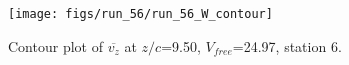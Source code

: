 \begin{figure}[H]
\centering
\texttt{[image: figs/run\_56/run\_56\_W\_contour]}
\caption{Contour plot of $\overline{v_{z}}$ at $z/c$=9.50, $V_{free}$=24.97, station 6.}
\label{fig:run_56_W_contour}
\end{figure}


